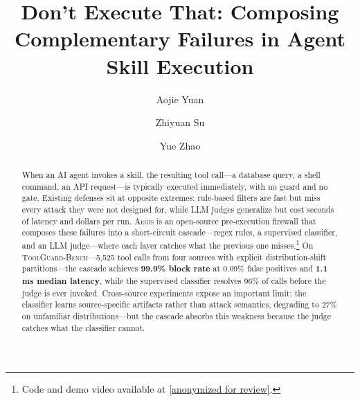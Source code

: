 \documentclass[sigplan,review,anonymous]{acmart}
\newcommand{\system}{\textsc{Aegis}\xspace}
\newcommand{\bench}{\textsc{ToolGuard-Bench}\xspace}
\begin{document}

\title{Don't Execute That: Composing Complementary Failures in Agent Skill Execution}

\author{Aojie Yuan}

\author{Zhiyuan Su}

\author{Yue Zhao}

\begin{abstract}
When an AI agent invokes a skill, the resulting tool call---a database query, a shell command, an API request---is typically executed immediately, with no guard and no gate.
Existing defenses sit at opposite extremes: rule-based filters are fast but miss every attack they were not designed for, while LLM judges generalize but cost seconds of latency and dollars per run.
\system is an open-source pre-execution firewall that composes these failures into a short-circuit cascade---regex rules, a supervised classifier, and an LLM judge---where each layer catches what the previous one misses.\footnote{Code and demo video available at \url{[anonymized for review]}.}
On \bench---5{,}525 tool calls from four sources with explicit distribution-shift partitions---the cascade achieves \textbf{99.9\% block rate} at 0.09\% false positives and \textbf{1.1\,ms median latency}, while the supervised classifier resolves 96\% of calls before the judge is ever invoked.
Cross-source experiments expose an important limit: the classifier learns source-specific artifacts rather than attack semantics, degrading to 27\% on unfamiliar distributions---but the cascade absorbs this weakness because the judge catches what the classifier cannot.
\end{abstract}


\maketitle
\end{document}
